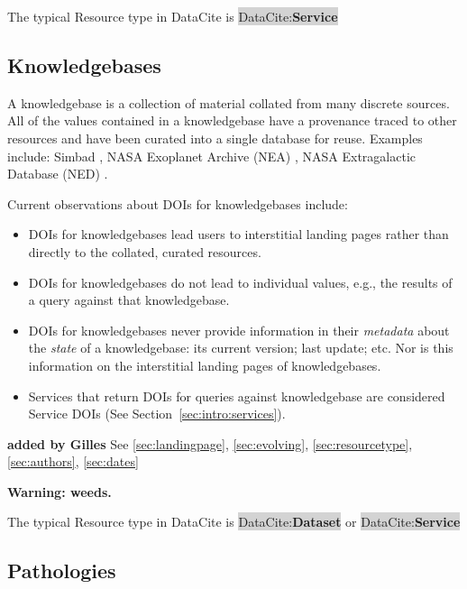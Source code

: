 \documentclass[11pt,a4paper]{ivoa}
\newcommand{\dataciteterm}[1]{\colorbox{lightgray}{DataCite:\textbf{#1}}}
\begin{document}
The typical Resource type in DataCite is \dataciteterm{Service}

\subsection{Knowledgebases}
\label{sec:intro:kdbs}

A knowledgebase is a collection of material collated from many discrete sources.
All of the values contained in a knowledgebase have a provenance traced to other resources and have been curated into a single database for reuse.
Examples include: Simbad \citep[as originally described in, ][]{2000A&AS..143....9W}, NASA Exoplanet Archive (NEA) \citep{NEA12-doi2bib} \citep[as originally described in,][]{2013PASP..125..989A}, NASA Extragalactic Database (NED) \citep{NED1-doi2bib} \citep[as originally described in,][]{1991ASSL..171...89H}. 

Current observations about DOIs for knowledgebases include:


\begin{itemize}
	\item DOIs for knowledgebases lead users to interstitial landing pages rather than directly to the collated, curated resources. 
	\item DOIs for knowledgebases do not lead to individual values, e.g., the results of a query against that knowledgebase.
	\item DOIs for knowledgebases never provide information in their \textit{metadata} about the \textit{state} of a knowledgebase: its current version; last update; etc. 
	Nor is this information on the interstitial landing pages of knowledgebases.
	\item Services that return DOIs for queries against knowledgebase are considered Service DOIs (See Section~\ref{sec:intro:services}).
\end{itemize}

\textbf{\color{red} added by Gilles}
See \ref{sec:landingpage}, \ref{sec:evolving}, \ref{sec:resourcetype}, \ref{sec:authors}, \ref{sec:dates}

\textbf{Warning: weeds.}

The typical Resource type in DataCite is \dataciteterm{Dataset} or \dataciteterm{Service}

\subsection{Pathologies}
\label{sec:use:patho}
\end{document}
